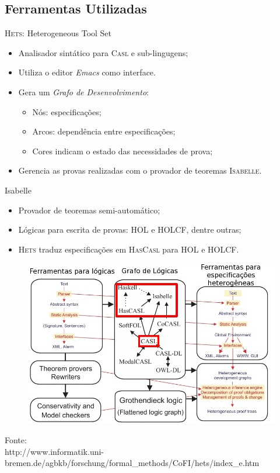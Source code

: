 \documentclass{beamer}
\newcommand{\HasCASL}{\textsc{HasCasl}\xspace}
\newcommand{\CASL}{\textsc{Casl}\xspace}
\newcommand{\Hets}{\textsc{Hets}\xspace}
\newcommand{\HOL}{\textsc{HOL}\xspace}
\newcommand{\Isabelle}{\textsc{Isabelle}\xspace}
\newcommand{\HOLCF}{\textsc{HOLCF}\xspace}
\begin{document}
\subsection{Ferramentas Utilizadas}
\begin{frame}

\begin{block}{\Hets: Heterogeneous Tool Set}
	\begin{itemize}
		\item Analisador sintático para \CASL e sub-lingugens;
		\item Utiliza o editor \textit{Emacs} como interface.
		\item Gera um \textit{Grafo de Desenvolvimento}:
			\begin{itemize}
				\item Nós: especificações;
				\item Arcos: dependência entre especificações;
				\item Cores indicam o estado das necessidades de prova;
			\end{itemize}
		\item Gerencia as provas realizadas com o provador de teoremas \Isabelle.
	\end{itemize}
\end{block}

\begin{block}{Isabelle}
	\begin{itemize}
		\item Provador de teoremas semi-automático;
		\item Lógicas para escrita de provas: \HOL e \HOLCF, dentre outras;
		\item \Hets traduz especificações em \HasCASL para \HOL  e \HOLCF.
	\end{itemize}
\end{block}
\end{frame}

\begin{frame}
\begin{figure}
\centering
\includegraphics[height=0.72\textheight]{figuras/hets-new}
\end{figure}
{\tiny{Fonte:\\ http://www.informatik.uni-bremen.de/agbkb/\allowbreak{}forschung/\allowbreak{}formal\_methods/\allowbreak{}CoFI/hets/index\_e.htm}}
\end{frame}
\end{document}
